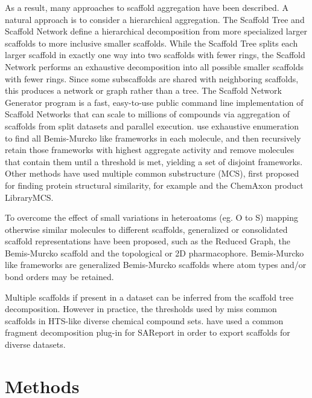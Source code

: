 \documentclass[journal=jacsat,manuscript=article]{achemso}
\begin{document}
As a result, many approaches to scaffold aggregation have been described. A natural approach is to consider a hierarchical aggregation. The Scaffold Tree\cite{Ertl2011ScaffoldTree} and Scaffold Network\cite{Varin2011ScafNet} define a hierarchical decomposition from more specialized larger scaffolds to more inclusive smaller scaffolds. While the Scaffold Tree splits each larger scaffold in exactly one way into two scaffolds with fewer rings, the Scaffold Network performs an exhaustive decomposition into all possible smaller scaffolds with fewer rings.  Since some subscaffolds are shared with neighboring scaffolds, this produces a network or graph rather than a tree. The Scaffold Network Generator program\cite{Matlock2013SNG} is a fast, easy-to-use public command line implementation of Scaffold Networks that can scale to millions of compounds via aggregation of scaffolds from split datasets and parallel execution.  \citeauthor{Harper2004DDclus} use exhaustive enumeration to find all Bemis-Murcko like frameworks in each molecule, and then recursively retain those frameworks with highest aggregate activity and remove molecules that contain them until a threshold is met, yielding a set of disjoint frameworks.   Other methods have used multiple common substructure (MCS), first proposed for finding protein structural similarity\cite{Koch1997MCSprot}, for example \cite{Quintus2009MCS} and the ChemAxon product LibraryMCS. 

To overcome the effect of small variations in heteroatoms (eg. O to S) mapping 
otherwise similar molecules to different scaffolds, generalized or consolidated scaffold representations have been proposed, such as the Reduced Graph\cite{Barker2003RG}, the Bemis-Murcko scaffold\cite{BemisMurcko1996} and the topological or 2D pharmacophore\cite{Schneider1999ScafHopTP}. Bemis-Murcko like frameworks \cite{Harper2004DDclus} are generalized Bemis-Murcko scaffolds where atom types and/or bond orders may be retained.    

Multiple scaffolds if present in a dataset can be inferred from the scaffold tree decomposition\cite{ClarkLabute2008SAReport}. However in practice, the thresholds used by \citeauthor{ClarkLabute2008SAReport} miss common scaffolds in HTS-like diverse chemical compound sets. \citeauthor{Bandyopadhyay2011ACS} have used a common fragment decomposition plug-in for SAReport in order to export scaffolds for diverse datasets.   

\section{Methods}
\label{sec:methods}
\end{document}
